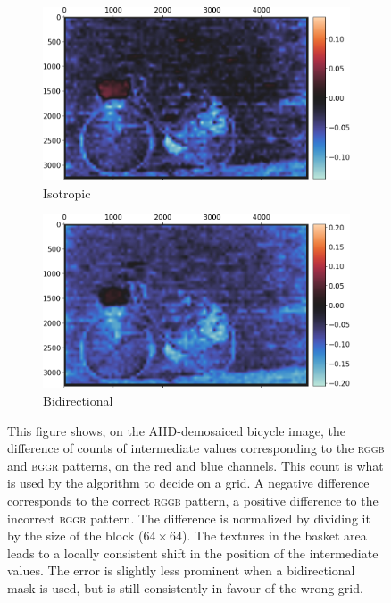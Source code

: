 \documentclass{ipol}
\begin{document}
\begin{figure}[ht]
\centering
\begin{subfigure}[t]{.5\linewidth}
\includegraphics[width=\linewidth]{images/bike/ahd_iso_64_diff_rggb_bggr.png}
\caption{Isotropic}
\end{subfigure}%
\begin{subfigure}[t]{.5\linewidth}
\includegraphics[width=\linewidth]{images/bike/ahd_bid_64_diff_rggb_bggr.png}
\caption{Bidirectional}
\end{subfigure}
        \label{fig:bike_ahd}
\caption{This figure shows, on the AHD-demosaiced bicycle image, the difference of counts of intermediate values corresponding to the \textsc{rggb} and \textsc{bggr} patterns, on the red and blue channels. This count is what is used by the algorithm to decide on a grid. A negative difference corresponds to the correct \textsc{rggb} pattern, a positive difference to the incorrect \textsc{bggr} pattern. The difference is normalized by dividing it by the size of the block ($64\times64$). The textures in the basket area leads to a locally consistent shift in the position of the intermediate values. The error is slightly less prominent when a bidirectional mask is used, but is still consistently in favour of the wrong grid.}
\end{figure}
\end{document}
